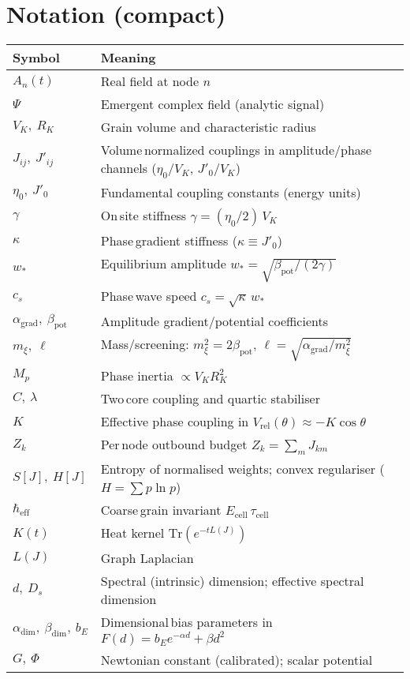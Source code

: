 \documentclass[11pt]{article}
\begin{document}
\section{Notation (compact)}
\begin{center}
\small
\begin{tabular}{ll}
\hline
\textbf{Symbol} & \textbf{Meaning} \\
\hline
$A_n(t)$ & Real field at node $n$ \\
$\Psi$ & Emergent complex field (analytic signal) \\
$V_K,\ R_K$ & Grain volume and characteristic radius \\
$J_{ij},\ J'_{ij}$ & Volume\,normalized couplings in amplitude/phase channels ($\eta_0/V_K$, $J'_0/V_K$) \\
$\eta_0,\ J'_0$ & Fundamental coupling constants (energy units) \\
$\gamma$ & On\,site stiffness $\gamma=(\eta_0/2)\,V_K$ \\
$\kappa$ & Phase\,gradient stiffness ($\kappa\equiv J'_0$) \\
$w_*$ & Equilibrium amplitude $w_*=\sqrt{\beta_{\mathrm{pot}}/(2\gamma)}$ \\
$c_s$ & Phase\,wave speed $c_s=\sqrt{\kappa}\,w_*$ \\
$\alpha_{\mathrm{grad}},\ \beta_{\mathrm{pot}}$ & Amplitude gradient/potential coefficients \\
$m_\xi,\ \ell$ & Mass/screening: $m_\xi^2=2\beta_{\mathrm{pot}}$, $\ell=\sqrt{\alpha_{\mathrm{grad}}/m_\xi^2}$ \\
$M_p$ & Phase inertia $\propto V_K R_K^2$ \\
$C,\ \lambda$ & Two\,core coupling and quartic stabiliser \\
$K$ & Effective phase coupling in $V_{\mathrm{rel}}(\theta)\approx -K\cos\theta$ \\
$Z_k$ & Per\,node outbound budget $Z_k=\sum_m J_{km}$ \\
$S[J],\ H[J]$ & Entropy of normalised weights; convex regulariser ($H=\sum p\ln p$) \\
$\hbar_{\mathrm{eff}}$ & Coarse\,grain invariant $E_{\mathrm{cell}}\,\tau_{\mathrm{cell}}$ \\
$K(t)$ & Heat kernel $\mathrm{Tr}(e^{-t L(J)})$ \\
$L(J)$ & Graph Laplacian \\
$d,\ D_s$ & Spectral (intrinsic) dimension; effective spectral dimension \\
$\alpha_{\mathrm{dim}},\ \beta_{\mathrm{dim}},\ b_E$ & Dimensional\,bias parameters in $F(d)=b_E e^{-\alpha d}+\beta d^2$ \\
$G,\ \Phi$ & Newtonian constant (calibrated); scalar potential \\
\hline
\end{tabular}
\end{center}
\end{document}
